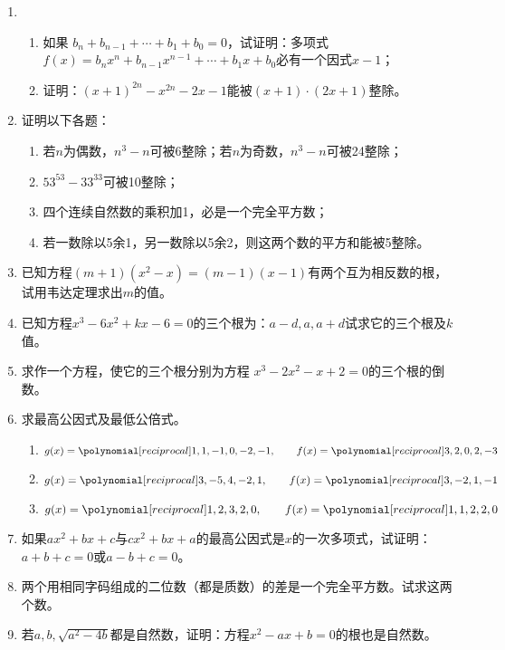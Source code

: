 \begin{enumerate}
\item 
\begin{enumerate}
\item 如果 $b_n+b_{n-1}+\cdots+b_1+b_0=0$，试证明：多项式$f(x)=b_nx^n+b_{n-1}x^{n-1}+\cdots+b_1x+b_0$必有一个因式$x-1$；
\item 证明：$(x+1)^{2n}-x^{2n}-2x-1$能被$(x+1)\cdot (2x+1)$整除。
\end{enumerate}

\item 证明以下各题：
\begin{enumerate}
    \item 若$n$为偶数，$n^3-n$可被6整除；若$n$为奇数，$n^3-n$可被24整除；
    \item $53^{53}-33^{33}$可被10整除；
    \item 四个连续自然数的乘积加1，必是一个完全平方数；
    \item 若一数除以5余1，另一数除以5余2，则这两个数的平方和能被5整除。
\end{enumerate}

\item 已知方程$(m+1)(x^2-x)=(m-1)(x-1)$有两个互为相反数的根，试用韦达定理求出$m$的值。
\item 已知方程$x^3-6x^2+kx-6=0$的三个根为：$a-d,a,a+d$试求它的三个根及$k$值。
\item 求作一个方程，使它的三个根分别为方程 $x^3-2x^2-x+2=0$的三个根的倒数。

\item 求最高公因式及最低公倍式。
\begin{enumerate}
    \item $g(x)=\poly{1,1,-1,0,-2,-1},\qquad f(x)=\poly{3,2,0,2,-3}$
    \item $g(x)=\poly{3,-5,4,-2,1},\qquad f(x)=\poly{3,-2,1,-1}$
    \item $g(x)=\poly{1,2,3,2,0},\qquad f(x)=\poly{1,1,2,2,0}$
\end{enumerate}


\item 如果$ax^2+bx+c$与$cx^2+bx+a$的最高公因式是$x$的一次多项式，试证明：
$a+b+c=0$或$a-b+c=0$。
\item 两个用相同字码组成的二位数（都是质数）的差是一个完全平方数。试求这两个数。
\item 若$a,b,\sqrt{a^2-4b}$都是自然数，证明：方程$x^2-ax+b=0$的根也是自然数。

\end{enumerate}

